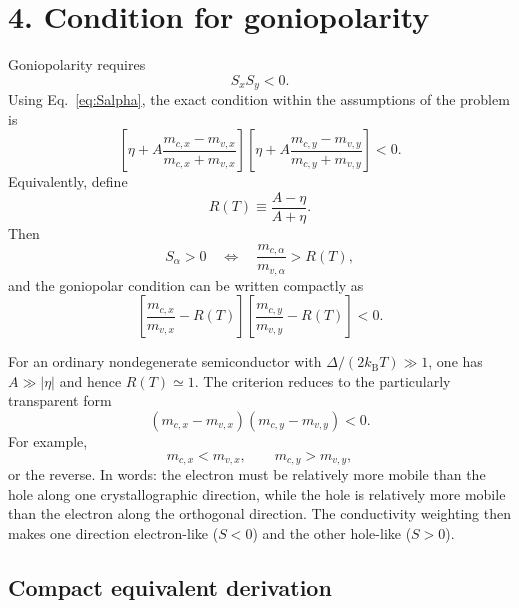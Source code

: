 \documentclass[11pt]{article}
\newcommand{\kb}{k_{\mathrm B}}
\begin{document}
\section*{4. Condition for goniopolarity}

Goniopolarity requires
\begin{equation}
\boxed{S_xS_y<0.}
\end{equation}
Using Eq.~\eqref{eq:Salpha}, the exact condition within the assumptions of the problem is
\begin{equation}
\boxed{
\left[
\eta+A\frac{m_{c,x}-m_{v,x}}{m_{c,x}+m_{v,x}}
\right]
\left[
\eta+A\frac{m_{c,y}-m_{v,y}}{m_{c,y}+m_{v,y}}
\right]<0.
}
\label{eq:exactcondition}
\end{equation}
Equivalently, define
\begin{equation}
R(T)\equiv\frac{A-\eta}{A+\eta}.
\end{equation}
Then
\begin{equation}
S_\alpha>0
\quad\Longleftrightarrow\quad
\frac{m_{c,\alpha}}{m_{v,\alpha}}>R(T),
\end{equation}
and the goniopolar condition can be written compactly as
\begin{equation}
\boxed{
\left[
\frac{m_{c,x}}{m_{v,x}}-R(T)
\right]
\left[
\frac{m_{c,y}}{m_{v,y}}-R(T)
\right]<0.
}
\label{eq:Rcondition}
\end{equation}

For an ordinary nondegenerate semiconductor with $\Delta/(2\kb T)\gg1$, one has $A\gg|\eta|$ and hence $R(T)\simeq1$. The criterion reduces to the particularly transparent form
\begin{equation}
\boxed{
(m_{c,x}-m_{v,x})(m_{c,y}-m_{v,y})<0.
}
\label{eq:simplecondition}
\end{equation}
For example,
\begin{equation}
\boxed{
 m_{c,x}<m_{v,x},
 \qquad
 m_{c,y}>m_{v,y},
}
\end{equation}
or the reverse. In words: the electron must be relatively more mobile than the hole along one crystallographic direction, while the hole is relatively more mobile than the electron along the orthogonal direction. The conductivity weighting then makes one direction electron-like ($S<0$) and the other hole-like ($S>0$).

\subsection*{Compact equivalent derivation}
\end{document}
